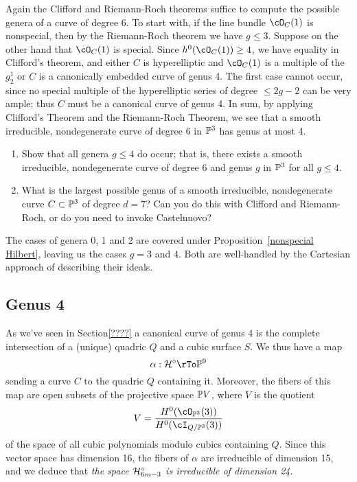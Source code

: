 Again the Clifford and Riemann-Roch theorems suffice to compute the possible genera of a curve of degree 6. To start with,  if the line bundle $\cO_C(1)$ is nonspecial, then by the Riemann-Roch theorem we have $g \leq 3$. Suppose on the other hand that $\cO_C(1)$ is special. Since   $h^{0}(\cO_C(1)) \geq 4$, we have equality in Clifford's theorem, and either $C$ is hyperelliptic and $\cO_C(1)$ is a multiple of the $g^{1}_{2}$ or  $C$ is  a canonically embedded curve of genus 4. The first case cannot occur, since no special multiple of the hyperelliptic series of degree $\leq 2g-2$ can be very ample; thus $C$ must be a canonical curve of genus 4. In sum, by applying Clifford's Theorem and the Riemann-Roch Theorem, we see that a smooth irreducible, nondegenerate curve of degree 6 in $\PP^3$ has genus at most 4.

\begin{exercise}
\begin{enumerate}
\item Show that all genera $g \leq 4$ do occur; that is, there exists a smooth irreducible, nondegenerate curve of degree 6 and genus $g$ in $\PP^3$ for all $g \leq 4$.
\item What is the largest possible genus of a smooth irreducible, nondegenerate curve $C \subset \PP^3$ of degree $d=7$? Can you do this with Clifford and Riemann-Roch, or do you need to invoke Castelnuovo?
\end{enumerate}
\end{exercise}

The cases of genera 0, 1 and 2 are covered under Proposition~\ref{nonspecial Hilbert}, leaving us the cases $g = 3$ and 4. Both are well-handled by the Cartesian approach of describing their ideals.

\subsection{Genus 4}

As we've seen in Section\ref{????} a canonical curve of genus 4 is the complete intersection of a (unique) quadric $Q$ and a cubic surface $S$. We thus have a map
$$
\alpha : \cH^\circ \rTo \PP^9
$$
sending a curve $C$ to the quadric $Q$ containing it. Moreover, the fibers of this map are open subsets of the projective space $\PP V$, where $V$ is the quotient
$$
V = \frac{H^0(\cO_{\PP^3}(3))}{H^0(\cI_{Q/\PP^3}(3))}
$$
of the space of all cubic polynomials modulo cubics containing $Q$. Since this vector space has dimension 16, the fibers of $\alpha$ are irreducible of dimension 15, and we deduce that \emph{the space $\cH^\circ_{6m-3}$ is irreducible of dimension 24}.

